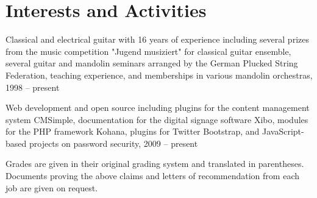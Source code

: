 \documentclass[11pt]{article}
\newenvironment{bottompar}{\par\vspace*{\fill}}{\clearpage}
\newcommand{\indentwidth}{0.08\textwidth}
\begin{document}
\section*{Interests and Activities}

\hangpara{\indentwidth}{1}Classical and electrical guitar with 16 years of experience including several prizes from the music competition "Jugend musiziert" for classical guitar ensemble, several guitar and mandolin seminars arranged by the German Plucked String Federation, teaching experience, and memberships in various mandolin orchestras, 1998 -- present

\hangpara{\indentwidth}{1}Web development and open source including plugins for the content management system CMSimple, documentation for the digital signage software Xibo, modules for the PHP framework Kohana, plugins for Twitter Bootstrap, and JavaScript-based projects on password security, 2009 -- present

\begin{bottompar}
\small{Grades are given in their original grading system and translated in parentheses. Documents proving the above claims and letters of recommendation from each job are given on request.}
\end{bottompar}
\end{document}
